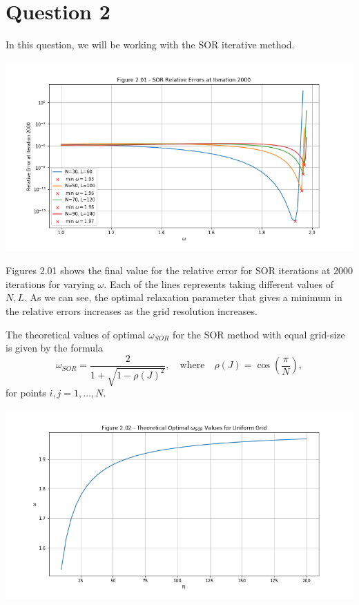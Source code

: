 \documentclass[12pt]{article}
\begin{document}
\newpage
\section{Question 2}
    In this question, we will be working with the SOR iterative method.

    \includegraphics[width=\textwidth]{fig2.01}

    Figures 2.01 shows the final value for the relative error for SOR iterations at 2000 iterations for varying $\omega$. Each of the lines represents taking different values of $N, L$. As we can see, the optimal relaxation parameter that gives a minimum in the relative errors increases as the grid resolution increases.

    The theoretical values of optimal $\omega_{SOR}$ for the SOR method with equal grid-size is given by the formula
    \begin{equation}
        \omega_{SOR} = \frac{2}{1 + \sqrt{1 - \rho (J)^2}}, \quad \text{where} \quad \rho (J) = \cos \left(\frac{\pi}{N}\right),
    \end{equation}
    for points $i, j = 1, \ldots, N$.

    \includegraphics[width=\textwidth]{fig2.02}
\end{document}
